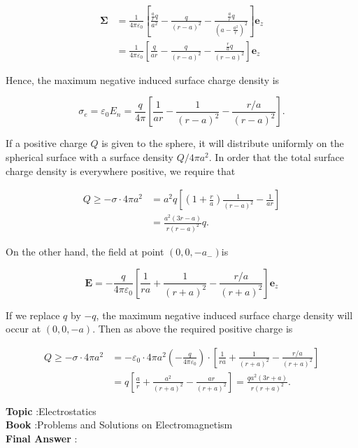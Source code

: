 \documentclass[10pt]{article}
\begin{document}
$$
\begin{aligned}
\mathbf{\Sigma} &=\frac{1}{4 \pi \varepsilon_{0}}\left[\frac{\frac{a}{r} q}{a^{2}}-\frac{q}{(r-a)^{2}}-\frac{\frac{a}{r} q}{\left(a-\frac{a^{2}}{r}\right)^{2}}\right] \mathbf{e}_{z} \\
&=\frac{1}{4 \pi \varepsilon_{0}}\left[\frac{q}{a r}-\frac{q}{(r-a)^{2}}-\frac{\frac{r}{a} q}{(r-a)^{2}}\right] \mathbf{e}_{z}
\end{aligned}
$$

Hence, the maximum negative induced surface charge density is

$$
\sigma_{e}=\varepsilon_{0} E_{n}=\frac{q}{4 \pi}\left[\frac{1}{a r}-\frac{1}{(r-a)^{2}}-\frac{r / a}{(r-a)^{2}}\right] .
$$

If a positive charge $Q$ is given to the sphere, it will distribute uniformly on the spherical surface with a surface density $Q / 4 \pi a^{2}$. In order that the total surface charge density is everywhere positive, we require that

$$
\begin{aligned}
Q \geq-\sigma \cdot 4 \pi a^{2} &=a^{2} q\left[\left(1+\frac{r}{a}\right) \frac{1}{(r-a)^{2}}-\frac{1}{a r}\right] \\
&=\frac{a^{2}(3 r-a)}{r(r-a)^{2}} q .
\end{aligned}
$$

On the other hand, the field at point $\left(0,0,-a_{-}\right)$is

$$
\mathbf{E}=-\frac{q}{4 \pi \varepsilon_{0}}\left[\frac{1}{r a}+\frac{1}{(r+a)^{2}}-\frac{r / a}{(r+a)^{2}}\right] \mathbf{e}_{z}
$$

If we replace $q$ by $-q$, the maximum negative induced surface charge density will occur at $(0,0,-a)$. Then as above the required positive charge is

$$
\begin{aligned}
Q \geq-\sigma \cdot 4 \pi a^{2} &=-\varepsilon_{0} \cdot 4 \pi a^{2}\left(-\frac{q}{4 \pi \varepsilon_{0}}\right) \cdot\left[\frac{1}{r a}+\frac{1}{(r+a)^{2}}-\frac{r / a}{(r+a)^{2}}\right] \\
&=q\left[\frac{a}{r}+\frac{a^{2}}{(r+a)^{2}}-\frac{a r}{(r+a)^{2}}\right]=\frac{q a^{2}(3 r+a)}{r(r+a)^{2}} .
\end{aligned}
$$


\textbf{Topic} :Electrostatics\\
\textbf{Book} :Problems and Solutions on Electromagnetism\\
\textbf{Final Answer} :\\
\end{document}

